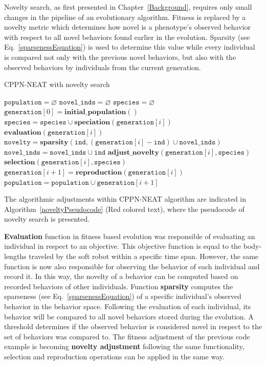 Novelty search, as first presented in Chapter~\ref{Background}, requires only small changes in the pipeline of an evolutionary algorithm. Fitness is replaced by a novelty metric which determines how novel is a phenotype's observed behavior with respect to all novel behaviors found earlier in the evolution. Sparsity (see Eq.~\ref{sparsenessEquation}) is used to determine this value while every individual is compared not only with the previous novel behaviors, but also with the observed behaviors by individuals from the current generation.
\begin{algorithm}[t!]
\caption{CPPN-NEAT with \textcolor{BrickRed}{novelty search}}
\label{noveltyPseudocode}
\begin{algorithmic}[1]
\STATE $\mathtt{population} = \varnothing$
\textcolor{BrickRed}{\STATE $\mathtt{novel\_inds} = \varnothing$}
\STATE $\mathtt{species} = \varnothing$
\STATE $\mathtt{generation}[0] = \mathbf{initial\_population}()$
\STATE $\mathtt{species} = \mathtt{species} \cup \mathbf{speciation}(\mathtt{generation}[i])$
\STATE $\mathbf{evaluation}(\mathtt{generation}[i])$
\textcolor{BrickRed}{
\STATE $\mathtt{novelty} = \mathbf{sparsity}(\mathtt{ind}, (\mathtt{generation}[i] - \mathtt{ind}) \cup \mathtt{novel\_inds})$
\STATE $\mathtt{novel\_inds} = \mathtt{novel\_inds} \cup \mathtt{ind}$
\ENDIF
\ENDFOR
\STATE $\mathbf{adjust\_novelty}(\mathtt{generation}[i], \mathtt{species})$
}
\STATE $\mathbf{selection}(\mathtt{generation}[i], \mathtt{species})$
\STATE $\mathtt{generation}[i+1] = \mathbf{reproduction}(\mathtt{generation}[i])$
\STATE $\mathtt{population} = \mathtt{population} \cup \mathtt{generation}[i+1]$
\ENDFOR
\end{algorithmic}
\end{algorithm}
The algorithmic adjustments within CPPN-NEAT algorithm are indicated in Algorithm~\ref{noveltyPseudocode} (\textcolor{BrickRed}{Red} colored text), where the pseudocode of novelty search is presented.

\textbf{Evaluation} function in fitness based evolution was responsible of evaluating an individual in respect to an objective. This objective function is equal to the body-lengths traveled by the soft robot within a specific time span. However, the same function is now also responsible for observing the behavior of each individual and record it. In this way, the novelty of a behavior can be computed based on recorded behaviors of other individuals. Function \textbf{sparsity} computes the sparseness (see Eq.~\ref{sparsenessEquation}) of a specific individual's observed behavior in the behavior space. Following the evaluation of each individual, its behavior will be compared to all novel behaviors stored during the evolution. A threshold determines if the observed behavior is considered novel in respect to the set of behaviors was compared to. The fitness adjustment of the previous code example is becoming \textbf{novelty adjustment} following the same functionality, selection and reproduction operations can be applied in the same way.


